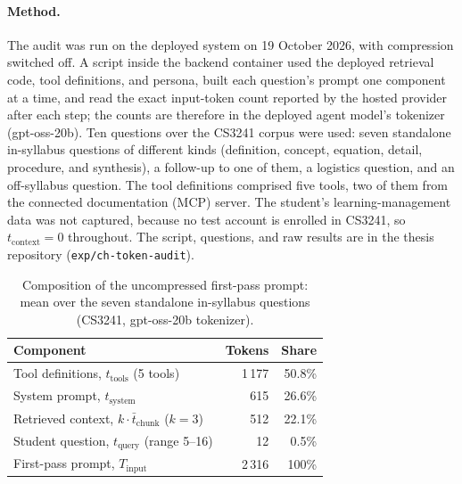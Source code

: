 \paragraph{Method.} The audit was run on the deployed system on 19 October
2026, with compression switched off. A script inside the backend container
used the deployed retrieval code, tool definitions, and persona, built each
question's prompt one component at a time, and read the exact input-token
count reported by the hosted provider after each step; the counts are
therefore in the deployed agent model's tokenizer (gpt-oss-20b). Ten
questions over the CS3241 corpus were used: seven standalone in-syllabus
questions of different kinds (definition, concept, equation, detail,
procedure, and synthesis), a follow-up to one of them, a logistics question,
and an off-syllabus question. The tool definitions comprised five tools, two
of them from the connected documentation (MCP) server. The student's
learning-management data was not captured, because no test account is
enrolled in CS3241, so $t_{\mathrm{context}} = 0$ throughout. The script,
questions, and raw results are in the thesis repository
(\texttt{exp/ch-token-audit}).

\begin{table}[htb]
  \centering
  \caption{Composition of the uncompressed first-pass prompt: mean over the
           seven standalone in-syllabus questions (CS3241, gpt-oss-20b
           tokenizer).}
  \label{design:tab:tokenaudit}
  \begin{tabular}{l r r}
    \hline
    \textbf{Component} & \textbf{Tokens} & \textbf{Share} \\
    \hline
    Tool definitions, $t_{\mathrm{tools}}$ (5 tools)          & 1\,177 & 50.8\% \\
    System prompt, $t_{\mathrm{system}}$                      & 615    & 26.6\% \\
    Retrieved context, $k \cdot \bar{t}_{\mathrm{chunk}}$ ($k=3$) & 512 & 22.1\% \\
    Student question, $t_{\mathrm{query}}$ (range 5--16)      & 12     & 0.5\%  \\
    \hline
    First-pass prompt, $T_{\mathrm{input}}$                   & 2\,316 & 100\%  \\
    \hline
  \end{tabular}
\end{table}


